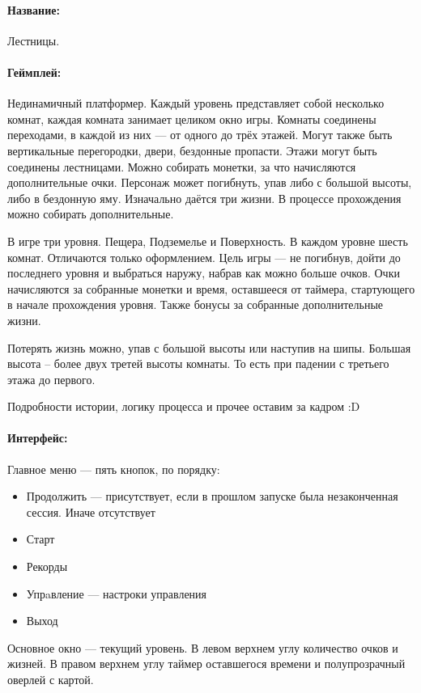 \documentclass[12pt,a4paper]{article}
\begin{document}
\newcommand{\pic}[2]
           {
             \texttt{[image: \#2]}
           
           }
             
\paragraph{Название:} Лестницы.
\paragraph{Геймплей:} Нединамичный платформер. Каждый уровень представляет собой несколько комнат, каждая комната занимает целиком окно игры. Комнаты соединены переходами, в каждой из них --- от одного до трёх этажей. Могут также быть вертикальные перегородки, двери, бездонные пропасти. Этажи могут быть соединены лестницами. Можно собирать монетки, за что начисляются дополнительные очки. Персонаж может погибнуть, упав либо с большой высоты, либо в бездонную яму. Изначально даётся три жизни. В процессе прохождения можно собирать дополнительные.

В игре три уровня. Пещера, Подземелье и Поверхность. В каждом уровне шесть комнат. Отличаются только оформлением. Цель игры --- не погибнув, дойти до последнего уровня и выбраться наружу, набрав как можно больше очков. Очки начисляются за собранные монетки и время, оставшееся от таймера, стартующего в начале прохождения уровня. Также бонусы за собранные дополнительные жизни.

Потерять жизнь можно, упав с большой высоты или наступив на шипы. Большая высота -- более двух третей высоты комнаты. То есть при падении с третьего этажа до первого.

Подробности истории, логику процесса и прочее оставим за кадром :D
\paragraph{Интерфейс:}
Главное меню --- пять кнопок, по порядку:
\begin{itemize}
\item Продолжить --- присутствует, если в прошлом запуске была незаконченная сессия. Иначе отсутствует
\item Старт
\item Рекорды
\item Упрaвление --- настроки управления
\item Выход
\end{itemize}
Основное окно --- текущий уровень. В левом верхнем углу количество очков и жизней. В правом верхнем углу таймер оставшегося времени и полупрозрачный оверлей с картой.
\end{document}
